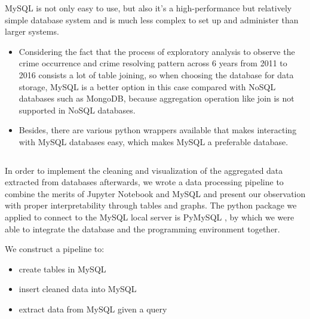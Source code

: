 \documentclass{article} %
\begin{document}
MySQL is not only easy to use, but also it’s a high-performance but relatively simple database system and is much less complex to set up and administer than larger systems.
\begin{itemize}
	\item Considering the fact that the process of exploratory analysis to observe the crime occurrence and crime resolving pattern across 6 years from 2011 to 2016 consists a lot of table joining, so when choosing the database for data storage, MySQL is a better option in this case compared with NoSQL databases such as MongoDB, because aggregation operation like join is not supported in NoSQL databases.
	\item Besides, there are various python wrappers available that makes interacting with MySQL databases easy, which makes MySQL a preferable database.
\end{itemize}
  

\[\]

 In order to implement the cleaning and visualization of the aggregated data extracted from databases afterwards, we wrote a data processing pipeline to combine the merits of Jupyter Notebook and MySQL and present our observation with proper interpretability through tables and graphs. The python package we applied to connect to the MySQL local server is PyMySQL \cite{pymysql}, by which we were able to integrate the database and the programming environment together.


We construct a pipeline to:

\begin{itemize}
	\item create tables in MySQL
	\item insert cleaned data into MySQL
	\item extract data from MySQL given a query
\end{itemize} 
\[\]
\end{document}
